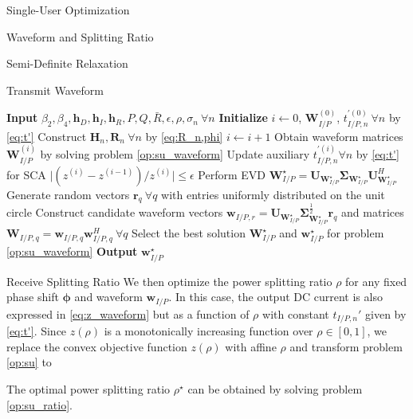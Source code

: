 \documentclass{IEEEtran}
\begin{document}
\begin{section}{Single-User Optimization}
\begin{subsection}{Waveform and Splitting Ratio}
\begin{subsubsection}{Semi-Definite Relaxation}
\begin{paragraph}{Transmit Waveform}
				\begin{algorithm}
					\caption{SDR: Transmit Waveform}
					\label{al:waveform_sdr}
					\begin{algorithmic}[1]
						\State \textbf{Input} $\beta_2,\beta_4,\boldsymbol{h}_D,\boldsymbol{h}_I,\boldsymbol{h}_R,P,Q,\bar{R},\epsilon,\rho,\sigma_n \ \forall n$
						\State \textbf{Initialize} $i \gets 0$, $\boldsymbol{W}_{I/P}^{(0)}$, $t_{I/P,n}^{\prime (0)} \ \forall n$ by \ref{eq:t'}
						\State Construct $\boldsymbol{H}_n,\boldsymbol{R}_n \ \forall n$ by \ref{eq:R_n,phi}
						\Repeat
						\State $i \gets i + 1$
						\State Obtain waveform matrices $\boldsymbol{W}_{I/P}^{(i)}$ by solving problem \ref{op:su_waveform}
						\State Update auxiliary $t_{I/P,n}^{\prime (i)} \forall n$ by \ref{eq:t'} for SCA
						\Until $\lvert (z^{(i)}-z^{(i-1)}) / z^{(i)} \rvert \le \epsilon$
						\State Perform EVD $\boldsymbol{W}_{I/P}^{\star}=\boldsymbol{U}_{\boldsymbol{W}_{I/P}^{\star}}\boldsymbol{\Sigma}_{\boldsymbol{W}_{I/P}^{\star}}\boldsymbol{U}_{\boldsymbol{W}_{I/P}^{\star}}^H$
						\State Generate random vectors $\boldsymbol{r}_q \ \forall q$ with entries uniformly distributed on the unit circle
						\State Construct candidate waveform vectors $\boldsymbol{w}_{I/P,r}=\boldsymbol{U}_{\boldsymbol{W}_{I/P}^{\star}}\boldsymbol{\Sigma}_{\boldsymbol{W}_{I/P}^{\star}}^{\frac{1}{2}}\boldsymbol{r}_q$ and matrices $\boldsymbol{W}_{I/P,q}=\boldsymbol{w}_{I/P,q}\boldsymbol{w}_{I/P,q}^H  \ \forall q$
						\State Select the best solution $\boldsymbol{W}_{I/P}^\star$ and $\boldsymbol{w}_{I/P}^\star$ for problem \ref{op:su_waveform}
						\State \textbf{Output} $\boldsymbol{w}_{I/P}^\star$
					\end{algorithmic}
				\end{algorithm}
			\end{paragraph}

			\begin{paragraph}{Receive Splitting Ratio}
				We then optimize the power splitting ratio $\rho$ for any fixed phase shift $\boldsymbol{\phi}$ and waveform $\boldsymbol{w}_{I/P}$. In this case, the output DC current is also expressed in \ref{eq:z_waveform} but as a function of $\rho$ with constant $t_{I/P,n}'$ given by \ref{eq:t'}. Since $z(\rho)$ is a monotonically increasing function over $\rho \in [0, 1]$, we replace the convex objective function $z(\rho)$ with affine $\rho$ and transform problem \ref{op:su} to
				\begin{maxi!}
					{\rho}{\rho}{\label{op:su_ratio}}{\label{eq:su_ratio_target}}
				\end{maxi!}
				The optimal power splitting ratio $\rho^\star$ can be obtained by solving problem \ref{op:su_ratio}.
			\end{paragraph}


\end{subsubsection}
\end{subsection}
\end{section}
\end{document}
